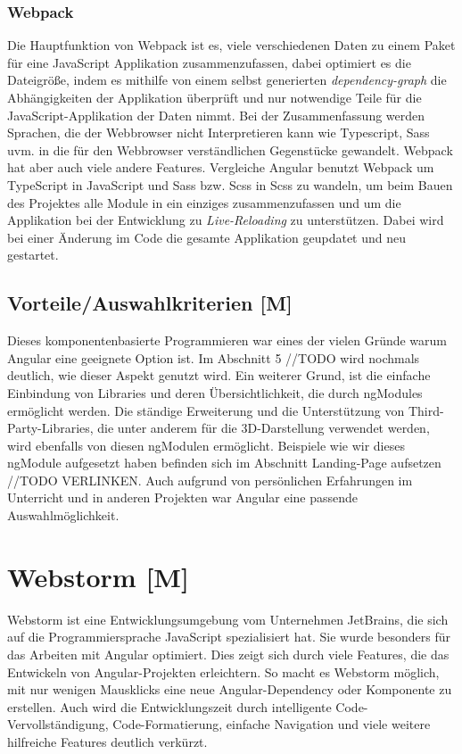 \subsubsection{Webpack}
Die Hauptfunktion von Webpack ist es, viele verschiedenen Daten zu einem Paket für eine JavaScript Applikation zusammenzufassen, dabei optimiert es die Dateigröße, indem es mithilfe von einem selbst generierten \emph{dependency-graph} die Abhängigkeiten der Applikation überprüft und nur notwendige Teile für die JavaScript-Applikation der Daten nimmt. Bei der Zusammenfassung werden Sprachen, die der Webbrowser nicht Interpretieren kann wie Typescript, Sass uvm. in die für den Webbrowser verständlichen Gegenstücke gewandelt. Webpack hat aber auch viele andere Features. Vergleiche \cite{Webpack}
Angular benutzt Webpack um TypeScript in JavaScript und Sass bzw. Scss in Scss zu wandeln, um beim Bauen des Projektes alle Module in ein einziges zusammenzufassen und um die Applikation bei der Entwicklung zu \emph{Live-Reloading} zu unterstützen. Dabei wird bei einer Änderung im Code die gesamte Applikation geupdatet und neu gestartet. 

\subsection{Vorteile/Auswahlkriterien [M]}
Dieses komponentenbasierte Programmieren war eines der vielen Gründe 
warum Angular eine geeignete Option ist. Im Abschnitt 5 //TODO  wird nochmals deutlich, wie dieser Aspekt genutzt wird. Ein weiterer Grund, ist die einfache Einbindung von 
Libraries und deren Übersichtlichkeit, die durch ngModules ermöglicht werden. Die ständige Erweiterung und die Unterstützung von Third-Party-Libraries, die unter anderem für die 3D-Darstellung verwendet werden, wird ebenfalls von diesen ngModulen ermöglicht. Beispiele wie wir dieses ngModule aufgesetzt haben befinden sich im Abschnitt Landing-Page aufsetzen //TODO VERLINKEN. Auch aufgrund von persönlichen Erfahrungen im Unterricht und in anderen Projekten war Angular eine passende Auswahlmöglichkeit. 
\cite{AngularNgModules}



\section{Webstorm [M]}
Webstorm ist eine Entwicklungsumgebung vom Unternehmen JetBrains, die sich auf die Programmiersprache JavaScript spezialisiert hat. Sie wurde besonders für das Arbeiten mit Angular optimiert. Dies zeigt sich durch viele Features, die das Entwickeln von Angular-Projekten erleichtern. So macht es Webstorm möglich, mit nur wenigen Mausklicks eine neue Angular-Dependency oder Komponente zu erstellen. Auch wird die Entwicklungszeit durch intelligente Code-Vervollständigung, Code-Formatierung, einfache Navigation und viele weitere hilfreiche Features deutlich verkürzt.
\cite{Webstorm}

